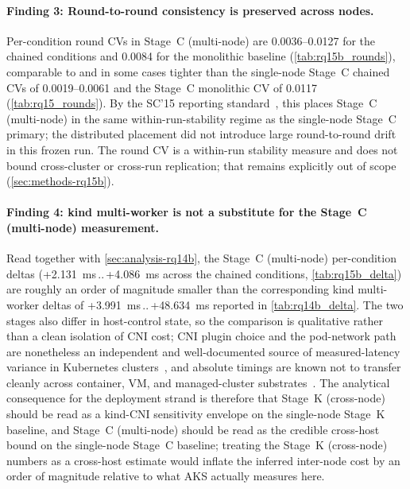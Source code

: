\paragraph{Finding 3: Round-to-round consistency is preserved across nodes.}
Per-condition round CVs in Stage~C (multi-node) are 0.0036--0.0127 for the chained
conditions and 0.0084 for the monolithic baseline
(\cref{tab:rq15b_rounds}), comparable to and in some cases tighter than the
single-node Stage~C chained CVs of 0.0019--0.0061 and the Stage~C monolithic
CV of 0.0117 (\cref{tab:rq15_rounds}). By the SC'15 reporting
standard~\cite{benchmarking_sc15}, this places Stage~C (multi-node) in the same
within-run-stability regime as the single-node Stage~C primary; the
distributed placement did not introduce large round-to-round drift in this
frozen run. The round CV is a within-run stability measure and does not
bound cross-cluster or cross-run replication; that remains explicitly out
of scope (\cref{sec:methods-rq15b}).

\paragraph{Finding 4: kind multi-worker is not a substitute for the Stage~C (multi-node) measurement.}
Read together with \cref{sec:analysis-rq14b}, the Stage~C (multi-node) per-condition
deltas (+2.131~ms\,..\,+4.086~ms across the chained conditions,
\cref{tab:rq15b_delta}) are roughly an order of magnitude smaller than the
corresponding kind multi-worker deltas of +3.991~ms\,..\,+48.634~ms
reported in \cref{tab:rq14b_delta}. The two stages also differ in
host-control state, so the comparison is qualitative rather than a clean
isolation of CNI cost; CNI plugin choice and the pod-network path are
nonetheless an independent and well-documented source of measured-latency
variance in Kubernetes clusters~\cite{cni_k8s_ic2e21}, and absolute timings
are known not to transfer cleanly across container, VM, and managed-cluster
substrates~\cite{virtualization_costs,managed_k8s_perf}. The analytical
consequence for the deployment strand is therefore that Stage~K (cross-node) should be
read as a kind-CNI sensitivity envelope on the single-node Stage~K baseline,
and Stage~C (multi-node) should be read as the credible cross-host bound on the
single-node Stage~C baseline; treating the Stage~K (cross-node) numbers as a cross-host
estimate would inflate the inferred inter-node cost by an order of
magnitude relative to what AKS actually measures here.

